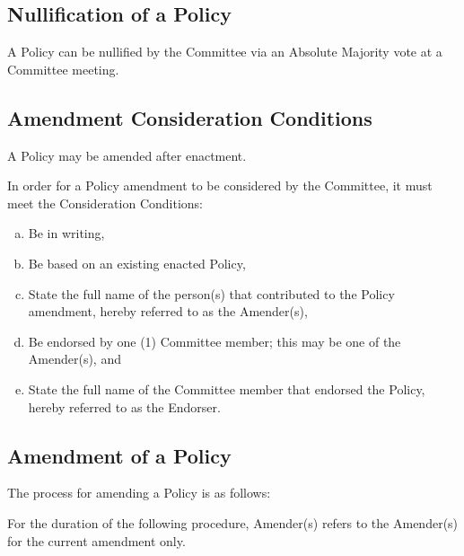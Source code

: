 \documentclass[a4paper,12pt]{article}
\begin{document}
\subsection{Nullification of a Policy}

A Policy can be nullified by the Committee via an Absolute Majority vote at a Committee meeting.

\subsection{Amendment Consideration Conditions}

A Policy may be amended after enactment.

In order for a Policy amendment to be considered by the Committee, it must meet the Consideration Conditions:

\begin{enumerate}[a)]
	\item Be in writing,
	\item Be based on an existing enacted Policy,
	\item State the full name of the person(s) that contributed to the Policy amendment, hereby referred to as the Amender(s),
	\item Be endorsed by one (1) Committee member; this may be one of the Amender(s), and
	\item State the full name of the Committee member that endorsed the Policy, hereby referred to as the Endorser.
\end{enumerate}

\subsection{Amendment of a Policy}

The process for amending a Policy is as follows:

For the duration of the following procedure, Amender(s) refers to the Amender(s) for the current amendment only.
\end{document}

